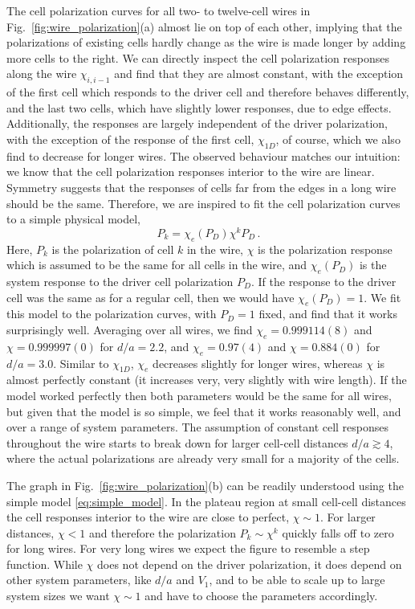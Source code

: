 The cell polarization curves for all two- to twelve-cell wires in
Fig.~\ref{fig:wire_polarization}(a) almost lie on top of each other, implying
that the polarizations of existing cells hardly change as the wire is made
longer by adding more cells to the right. We can directly inspect the cell
polarization responses along the wire $\chi_{i,i-1}$ and find that they are
almost constant, with the exception of the first cell which responds to the
driver cell and therefore behaves differently, and the last two cells, which
have slightly lower responses, due to edge effects. Additionally, the responses
are largely independent of the driver polarization, with the exception of the
response of the first cell, $\chi_{1D}$, of course, which we also find to
decrease for longer wires. The observed behaviour matches our intuition: we
know that the cell polarization responses interior to the wire are linear.
Symmetry suggests that the responses of cells far from the edges in a long wire
should be the same. Therefore, we are inspired to fit the cell polarization
curves to a simple physical model, 
%
\begin{equation}
  \label{eq:simple_model}
  P_k = \chi_e(P_D) \chi^k P_D \, .
\end{equation}
%
Here, $P_k$ is the polarization of cell $k$ in the wire, $\chi$ is the
polarization response which is assumed to be the same for all cells in the wire,
and $\chi_e(P_D)$ is the system response to the driver cell polarization $P_D$.
If the response to the driver cell was the same as for a regular cell, then we
would have $\chi_e(P_D) = 1$. We fit this model to the polarization curves, with
$P_D = 1$ fixed, and find that it works surprisingly well. Averaging over all
wires, we find $\chi_e = 0.999114(8)$ and $\chi = 0.999997(0)$ for $d/a=2.2$,
and $\chi_e = 0.97(4)$ and $\chi = 0.884(0)$ for $d/a = 3.0$. Similar to
$\chi_{1D}$, $\chi_e$ decreases slightly for longer wires, whereas $\chi$ is
almost perfectly constant (it increases very, very slightly with wire length).
If the model worked perfectly then both parameters would be the same for all
wires, but given that the model is so simple, we feel that it works reasonably
well, and over a range of system parameters. The assumption of constant cell
responses throughout the wire starts to break down for larger cell-cell
distances $d/a \gtrsim 4$, where the actual polarizations are already very small
for a majority of the cells.

The graph in Fig.~\ref{fig:wire_polarization}(b) can be readily understood using
the simple model \eqref{eq:simple_model}. In the plateau region at small
cell-cell distances the cell responses interior to the wire are close to
perfect, $\chi \sim 1$. For larger distances, $\chi < 1$ and therefore the
polarization $P_k \sim \chi^k$ quickly falls off to zero for long wires. For
very long wires we expect the figure to resemble a step function. While $\chi$
does not depend on the driver polarization, it does depend on other system
parameters, like $d/a$ and $V_1$, and to be able to scale up to large system
sizes we want $\chi \sim 1$ and have to choose the parameters accordingly.

